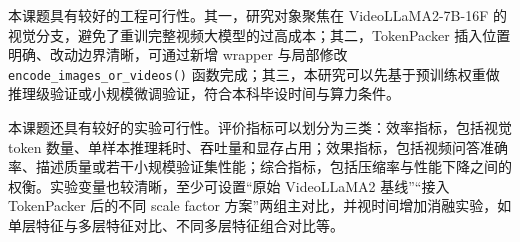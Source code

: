 本课题具有较好的工程可行性。其一，研究对象聚焦在 VideoLLaMA2-7B-16F 的视觉分支，避免了重训完整视频大模型的过高成本；其二，TokenPacker 插入位置明确、改动边界清晰，可通过新增 wrapper 与局部修改 \texttt{encode\_images\_or\_videos()} 函数完成；其三，本研究可以先基于预训练权重做推理级验证或小规模微调验证，符合本科毕设时间与算力条件。

本课题还具有较好的实验可行性。评价指标可以划分为三类：效率指标，包括视觉 token 数量、单样本推理耗时、吞吐量和显存占用；效果指标，包括视频问答准确率、描述质量或若干小规模验证集性能；综合指标，包括压缩率与性能下降之间的权衡。实验变量也较清晰，至少可设置“原始 VideoLLaMA2 基线”“接入 TokenPacker 后的不同 scale factor 方案”两组主对比，并视时间增加消融实验，如单层特征与多层特征对比、不同多层特征组合对比等。
